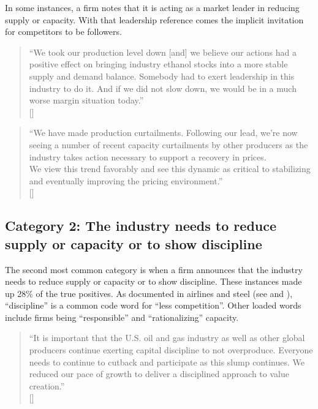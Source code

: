 In some instances, a firm notes that it is acting as a market leader in reducing supply or capacity. With that leadership reference comes the implicit invitation for competitors to be followers.

\begin{quote}
``We took our production level down [and] we believe our actions had a positive effect on bringing industry ethanol stocks into a more stable supply and demand balance. Somebody had to exert leadership in this industry to do it. And if we did not slow down, we would be in a much worse margin situation today.'' \\
\mbox{[]}
\end{quote}

\begin{quote}
``We have made production curtailments. Following our lead, we're now seeing a number of recent capacity curtailments by other producers as the industry takes action necessary to support a recovery in prices.\\
We view this trend favorably and see this dynamic as critical to stabilizing and eventually improving the pricing environment.'' \\
\mbox{[]}
\end{quote}

\subsection{Category 2: The industry needs to reduce supply or capacity or to show discipline}
The second most common category is when a firm announces that the industry needs to reduce supply or capacity or to show discipline. These instances made up 28\% of the true positives. As documented in airlines and steel (see \textcite{aryal2022coordinated} and \textcite{harrington2022collusion}), ``discipline'' is a common code word for ``less competition''. Other loaded words include firms being ``responsible'' and ``rationalizing'' capacity.


\begin{quote}
``It is important that the U.S. oil and gas industry as well as other global producers continue exerting capital discipline to not overproduce. Everyone needs to continue to cutback and participate as this slump continues. We reduced our pace of growth to deliver a disciplined approach to value creation.'' \\
\mbox{[]}
\end{quote}

